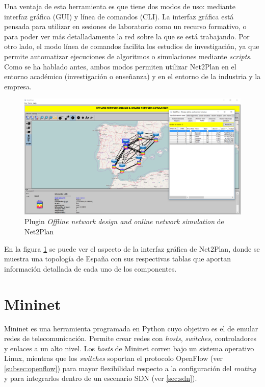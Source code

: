 Una ventaja de esta herramienta es que tiene dos modos de uso: mediante interfaz gráfica (\ac{GUI}) y línea de comandos (\ac{CLI}). La interfaz gráfica está pensada para utilizar en sesiones de laboratorio como un recurso formativo, o para poder ver más detalladamente la red sobre la que se está trabajando. Por otro lado, el modo línea de comandos facilita los estudios de investigación, ya que permite automatizar ejecuciones de algoritmos o simulaciones mediante \textit{scripts}. Como se ha hablado antes, ambos modos permiten utilizar Net2Plan en el entorno académico (investigación o enseñanza) y en el entorno de la industria y la empresa.

\begin{figure}[ht!]
	\centering
	\includegraphics[width=1\linewidth]{imagenes/n2p_redes}
	\caption{Plugin \textit{Offline network design and online network simulation} de Net2Plan}
	\label{fig:n2p_redes}
\end{figure}

En la figura \ref{fig:n2p_redes} se puede ver el aspecto de la interfaz gráfica de Net2Plan, donde se muestra una topología de España con sus respectivas tablas que aportan información detallada de cada uno de los componentes.

\section{Mininet}
\label{sec:mininet}

Mininet\cite{mininetbib} es una herramienta programada en Python cuyo objetivo es el de emular redes de telecomunicación. Permite crear redes con \textit{hosts}, \textit{switches}, controladores y enlaces a un alto nivel. Los \textit{hosts} de Mininet corren bajo un sistema operativo Linux, mientras que los \textit{switches} soportan el protocolo OpenFlow (ver \ref{subsec:openflow}) para mayor flexibilidad respecto a la configuración del \textit{routing} y para integrarlos dentro de un escenario \ac{SDN} (ver \ref{sec:sdn}).

